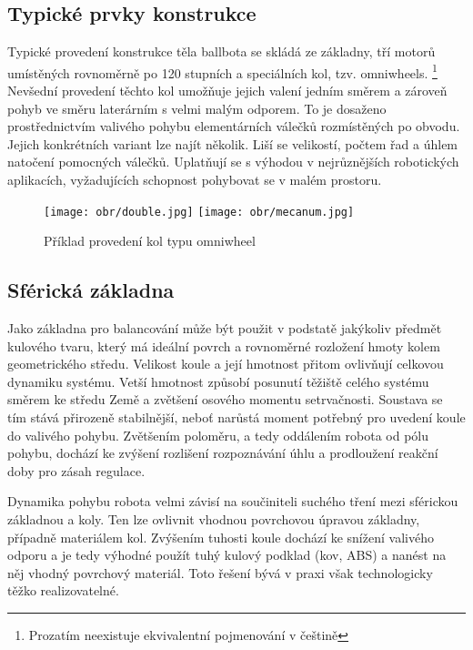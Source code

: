 \subsection{Typické prvky konstrukce}
\label{prvky_konstrukce}

Typické provedení konstrukce těla ballbota se skládá ze základny, tří motorů umístěných rovnoměrně po 120 stupních a speciálních kol, tzv. omniwheels. \footnote{Prozatím neexistuje ekvivalentní pojmenování v češtině} Nevšední provedení těchto kol umožňuje jejich valení jedním směrem a zároveň pohyb ve směru laterárním s velmi malým odporem. To je dosaženo prostřednictvím valivého pohybu elementárních válečků rozmístěných po obvodu. Jejich konkrétních variant lze najít několik. Liší se velikostí, počtem řad a úhlem natočení pomocných válečků. Uplatňují se s výhodou v nejrůznějších robotických aplikacích, vyžadujících schopnost pohybovat se v malém prostoru.
\vspace{5mm}
\begin{figure}[htb]
\begin{center}
\texttt{[image: obr/double.jpg]}
\texttt{[image: obr/mecanum.jpg]}
\end{center}
\caption{Příklad provedení kol typu omniwheel \cite{omni} \cite{omni2}}
\label{cocka}
\end{figure}

\subsection{Sférická základna}
\label{zakladna}

Jako základna pro balancování může být použit v podstatě jakýkoliv předmět kulového tvaru, který má ideální povrch a rovnoměrné rozložení hmoty kolem geometrického středu. Velikost koule a její hmotnost přitom ovlivňují celkovou dynamiku systému. Vetší hmotnost způsobí posunutí těžiště celého systému směrem ke středu Země a zvětšení osového momentu setrvačnosti. Soustava se tím stává přirozeně stabilnější, neboť narůstá moment potřebný pro uvedení koule do valivého pohybu. Zvětšením poloměru, a tedy oddálením robota od pólu pohybu, dochází ke zvýšení rozlišení rozpoznávání úhlu a prodloužení reakční doby pro zásah regulace. 

Dynamika pohybu robota velmi závisí na součiniteli suchého tření mezi sférickou základnou a koly. Ten lze ovlivnit vhodnou povrchovou úpravou základny, případně materiálem kol. Zvýšením tuhosti koule dochází ke snížení valivého odporu a je tedy výhodné použít tuhý kulový podklad (kov, ABS) a nanést na něj vhodný povrchový materiál. Toto řešení bývá v praxi však technologicky těžko realizovatelné.

